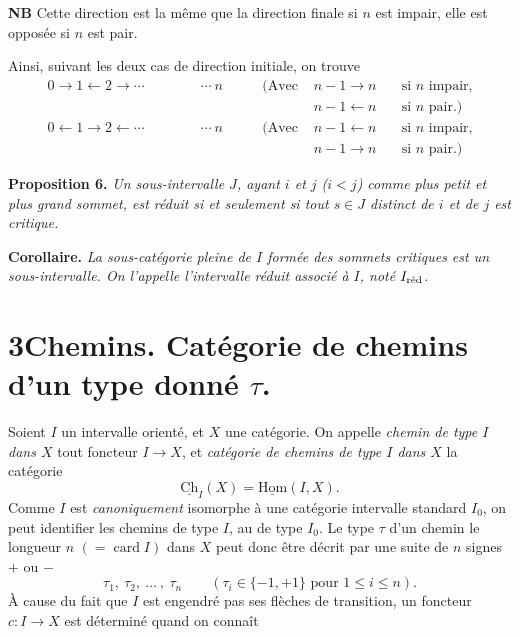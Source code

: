 \documentclass[11pt]{article}
\newcommand{\printedpage}[1]{\if\relax\detokenize{#1}\relax\else\marginpar{\raggedright\footnotesize p.~#1}\fi}
\newcommand{\msp}[1]{\marginpar{\raggedright\footnotesize [#1]}}
\newcommand{\Ch}{\underline{\mathrm{Ch}}}
\newcommand{\uHom}{\underline{\mathrm{Hom}}}
\begin{document}
\textbf{NB} Cette direction est la même que la direction finale si $n$ est impair, elle est opposée si $n$ est pair.

Ainsi, suivant les deux cas de direction initiale, on trouve
\[
\begin{aligned}
0 \longrightarrow 1 \longleftarrow 2 \longrightarrow \cdots \qquad\qquad \cdots\ n & \qquad (\text{Avec } & n-1 \longrightarrow n & \quad \text{si } n \text{ impair,}\\
& & n-1 \longleftarrow n & \quad \text{si } n \text{ pair.)}\\
0 \longleftarrow 1 \longrightarrow 2 \longleftarrow \cdots \qquad\qquad \cdots\ n & \qquad (\text{Avec } & n-1 \longleftarrow n & \quad \text{si } n \text{ impair,}\\
& & n-1 \longrightarrow n & \quad \text{si } n \text{ pair.)}
\end{aligned}
\]

\printedpage{8}

\textbf{Proposition 6.} \textit{Un sous-intervalle $J$, ayant $i$ et $j$ ($i < j$) comme plus petit et plus grand sommet, est réduit si et seulement si tout $s \in J$ distinct de $i$ et de $j$ est critique.}

\textbf{Corollaire.} \textit{La sous-catégorie pleine de $I$ formée des sommets critiques est un sous-intervalle. On l'appelle l'intervalle réduit associé à $I$, noté $I_{\textup{réd}}$.}

\printedpage{9}

\msp{page 13}

\section*{3\quad Chemins. Catégorie de chemins d'un type donné $\tau$.}

Soient $I$ un intervalle orienté, et $X$ une catégorie. On appelle \textit{chemin de type $I$ dans $X$} tout foncteur $I \longrightarrow X$, et \textit{catégorie de chemins de type $I$ dans $X$} la catégorie
\[
\Ch_I(X) = \uHom(I,X).
\]
Comme $I$ est \textit{canoniquement} isomorphe à une catégorie intervalle standard $I_0$, on peut identifier les chemins de type $I$, au de type $I_0$. Le type $\tau$ d'un chemin le longueur $n$ $(= \operatorname{card} I)$ dans $X$ peut donc être décrit par une suite de $n$ signes $+$ ou $-$ %
\[
\tau_1,\ \tau_2,\ \dots\ ,\ \tau_n \qquad (\tau_i \in \{-1,+1\} \text{ pour } 1 \leq i \leq n).
\]
À cause du fait que $I$ est engendré pas ses flèches de transition, un foncteur $c : I \longrightarrow X$ est déterminé quand on connaît %
\end{document}
